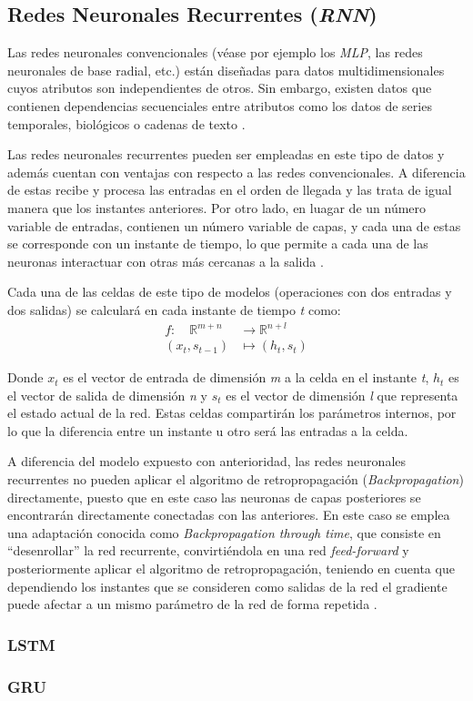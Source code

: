 \subsection{Redes Neuronales Recurrentes (\textit{RNN})}
Las redes neuronales convencionales (véase por ejemplo los \textit{MLP}, las redes neuronales de base radial, etc.) están diseñadas para
datos multidimensionales cuyos atributos son independientes de otros.
Sin embargo, existen datos que contienen dependencias secuenciales entre atributos como los datos de series temporales, biológicos o 
cadenas de texto \cite{book:aggarwal2018}.

Las redes neuronales recurrentes pueden ser empleadas en este tipo de datos y además cuentan con ventajas con respecto a las redes convencionales.
A diferencia de estas recibe y procesa las entradas en el orden de llegada y las trata de igual manera que los instantes anteriores.
Por otro lado, en luagar de un número variable de entradas, contienen un número variable de capas, y cada una de estas se corresponde con un 
instante de tiempo, lo que permite a cada una de las neuronas interactuar con otras más cercanas a la salida \cite{book:aggarwal2018}.

Cada una de las celdas de este tipo de modelos (operaciones con dos entradas y dos salidas) se calculará en cada instante de tiempo \textit{t} como:
\begin{equation}
    \begin{aligned}
    f: \quad \mathbb{R}^{m+n} & \rightarrow \mathbb{R}^{n+l} \\
    \left(x_t, s_{t-1}\right) & \mapsto\left(h_t, s_t\right)
    \end{aligned}
\end{equation}

Donde \(x_t\) es el vector de entrada de dimensión \textit{m} a la celda en el instante \textit{t}, \(h_{t}\) es el vector de salida de 
dimensión \textit{n} y \(s_{t}\) es el vector de dimensión \textit{l} que representa el estado actual de la red.
Estas celdas compartirán los parámetros internos, por lo que la diferencia entre un instante u otro será las entradas a la celda.


A diferencia del modelo expuesto con anterioridad, las redes neuronales recurrentes no pueden aplicar el algoritmo de retropropagación (\textit{Backpropagation})
directamente, puesto que en este caso las neuronas de capas posteriores se encontrarán directamente conectadas con las anteriores.
En este caso se emplea una adaptación conocida como \textit{Backpropagation through time}, que consiste en ``desenrollar'' la red recurrente, convirtiéndola
en una red \textit{feed-forward} y posteriormente aplicar el algoritmo de retropropagación, teniendo en cuenta que dependiendo los instantes 
que se consideren como salidas de la red el gradiente puede afectar a un mismo parámetro de la red de forma repetida \cite{book:rue2019}.

\subsubsection{LSTM}

\subsubsection{GRU}

